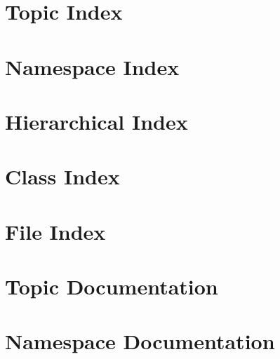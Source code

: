 \documentclass[twoside]{book}
\newcommand{\+}{\discretionary{\mbox{\scriptsize$\hookleftarrow$}}{}{}}
\begin{document}
\chapter{Topic Index}

\chapter{Namespace Index}

\chapter{Hierarchical Index}

\chapter{Class Index}

\chapter{File Index}

\chapter{Topic Documentation}







\chapter{Namespace Documentation}



\end{document}
